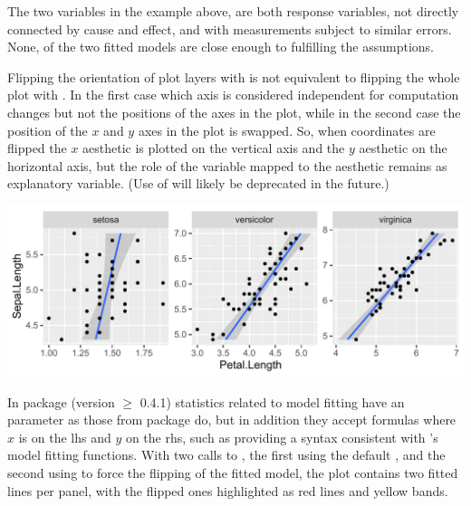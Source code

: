 \documentclass[krantz2]{krantz}\usepackage{knitr}
\begin{document}
The two variables in the example above, are both response variables, not directly connected by cause and effect, and with measurements subject to similar errors. None, of the two fitted models are close enough to fulfilling the assumptions.

\begin{explainbox}
Flipping the orientation of plot layers with  is not equivalent to flipping the whole plot with . In the first case which axis is considered independent for computation changes but not the positions of the axes in the plot, while in the second case the position of the $x$ and $y$ axes in the plot is swapped. So, when coordinates are flipped the $x$ aesthetic is plotted on the vertical axis and the $y$ aesthetic on the horizontal axis, but the role of the variable mapped to the  aesthetic remains as explanatory variable. (Use of  will likely be deprecated in the future.)

\begin{knitrout}\footnotesize
{}\color{fgcolor}\begin{kframe}
\begin{alltt}
 \hlopt{+}
  \hlstd{(} \hlstd{=} \hlstd{,}   \hlopt{~}  \hlopt{+}
  \hlstd{()}
\end{alltt}
\end{kframe}

{\centering \includegraphics[width=.99\textwidth]{figure/pos-flipping-06a-ggplot-1} 

}


\end{knitrout}
\end{explainbox}

In package \ggpmisc (version $\geq$ 0.4.1) statistics related to model fitting have an  parameter as those from package \ggplot do, but in addition they accept formulas where $x$ is on the lhs and $y$ on the rhs, such as  providing a syntax consistent with \Rlang's model fitting functions. With two calls to , the first using the default , and the second using  to force the flipping of the fitted model, the plot contains two fitted lines per panel, with the flipped ones highlighted as red lines and yellow bands.
\end{document}
